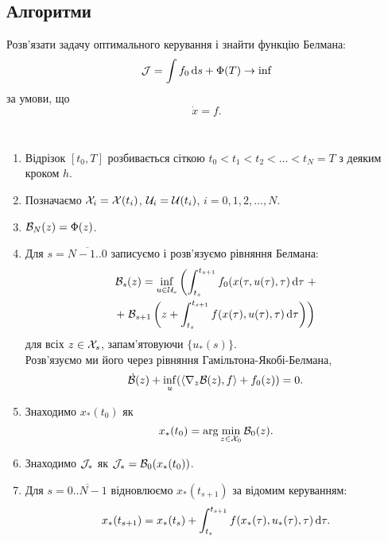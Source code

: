 \subsection{Алгоритми}

\begin{problem*}
	Розв'язати задачу оптимального керування і знайти функцію Белмана: \[ \mathcal{J} = \int f_0 \mathop{}\!\mathrm{d} s + \Phi(T) \to \inf \] за умови, що \[ \dot x = f. \]
\end{problem*}

\begin{algorithm} \tt
	\begin{enumerate}
		\item Відрізок $[t_0, T]$ розбивається сіткою $t_0 < t_1 < t_2 < \ldots < t_N = T$ з деяким кроком $h$.
		\item Позначаємо $\mathcal{X}_i = \mathcal{X} (t_i)$, $\mathcal{U}_i = \mathcal{U} (t_i)$, $i = 0,1,2,\ldots,N$.
		\item $\mathcal{B}_N(z) = \Phi(z)$.
		\item Для $s=\overline{N-1..0}$ записуємо і розв'язуємо рівняння Белмана: \begin{multline*}\mathcal{B}_s(z) = \inf_{u\in \mathcal{U}_s} \left(\int_{t_s}^{t_{s+1}} f_0(x(\tau,u(\tau),\tau)\mathop{}\!\mathrm{d}\tau\right.+\\+\left.\mathcal{B}_{s+1}\left(z+\int_{t_s}^{t_{s+1}} f(x(\tau),u(\tau),\tau) \mathop{}\!\mathrm{d} \tau\right)\right) \end{multline*} для всіх $z \in \mathcal{X}_s$, запам'ятовуючи $\{u_*(s)\}$. \\

		Розв'язуємо ми його через рівняння Гамільтона-Якобі-Белмана, \[\dot {\mathcal{B}}(z) + \inf_u (\langle \nabla_z \mathcal{B}(z), f \rangle + f_0(z) ) = 0. \]

		\item Знаходимо $x_*(t_0)$ як \[ x_*(t_0) = \arg\min_{z\in \mathcal{X}_0} \mathcal{B}_0(z).\]
		\item Знаходимо $\mathcal{J}_*$ як $\mathcal{J}_* = \mathcal{B}_0(x_*(t_0))$.
		\item Для $s=\overline{0..N-1}$ відновлюємо $x_*(t_{s+1})$ за відомим керуванням: \[x_*(t_{s+1}) = x_*(t_s) + \int_{t_s}^{t_{s+1}} f(x_*(\tau),u_*(\tau),\tau) \mathop{}\!\mathrm{d} \tau.\] 
	\end{enumerate}
\end{algorithm}